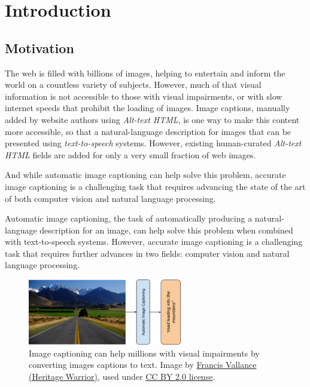 \chapter{Introduction}
\label{chapter:introduccion}


\section{Motivation}

The web is filled with billions of images, helping to entertain and inform the world on a countless variety of subjects. However, much of that visual information is not accessible to those with visual impairments, or with slow internet speeds that prohibit the loading of images. Image captions, manually added by website authors using\textit{ Alt-text HTML}, is one way to make this content more accessible, so that a natural-language description for images that can be presented using \textit{text-to-speech} systems. However, existing human-curated \textit{Alt-text HTML} fields are added for only a very small fraction of web images. 

And while automatic image captioning can help solve this problem, accurate image captioning is a challenging task that requires advancing the state of the art of both computer vision and natural language processing.

Automatic image captioning, the task of automatically producing a natural-language description for an image, can help solve this problem when combined with text-to-speech systems. However, accurate image captioning is a challenging task that requires further advances in two fields: computer vision and natural language processing.

\begin{figure}
	\centering
	\includegraphics[width=0.6\textwidth]{figs/ch1/image-captioning.png}
	\caption{Image captioning can help millions with visual impairments by converting images captions to text. Image by \href{https://www.flickr.com/photos/francisvallance/}{Francis Vallance (Heritage Warrior)}, used under \href{https://creativecommons.org/licenses/by/2.0/}{CC BY 2.0 license}.}
	\label{fig:image-captioning}
\end{figure}

